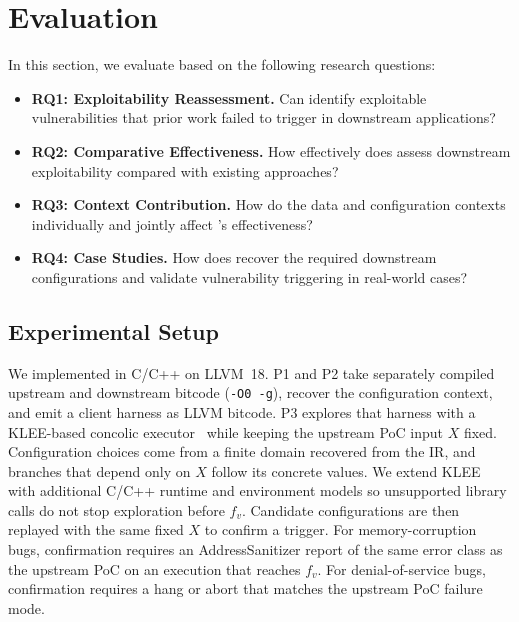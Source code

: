 \section{Evaluation}
\label{sec:eval}

In this section, we evaluate \sys based on the following research questions:

\begin{itemize}
    \setlength\itemsep{0.3em}
    \item \textbf{RQ1: Exploitability Reassessment.} Can \sys identify exploitable vulnerabilities that prior work failed to trigger in downstream applications?
    \item \textbf{RQ2: Comparative Effectiveness.} How effectively does \sys assess downstream exploitability compared with existing approaches?
    \item \textbf{RQ3: Context Contribution.} How do the data and configuration contexts individually and jointly affect \sys's effectiveness?
    \item \textbf{RQ4: Case Studies.} How does \sys recover the required downstream configurations and validate vulnerability triggering in real-world cases?
\end{itemize}

\subsection{Experimental Setup}
\label{subsec:eval-setup}

We implemented \sys in C/C++ on LLVM~18.
P1 and P2 take separately compiled upstream and downstream bitcode (\texttt{-O0 -g}), recover the configuration context, and emit a client harness as LLVM bitcode.
P3 explores that harness with a KLEE-based concolic executor~\cite{cadar2008klee} while keeping the upstream PoC input \(X\) fixed.
Configuration choices come from a finite domain recovered from the IR, and branches that depend only on \(X\) follow its concrete values.
We extend KLEE with additional C/C++ runtime and environment models so unsupported library calls do not stop exploration before \(f_v\).
Candidate configurations are then replayed with the same fixed \(X\) to confirm a trigger.
For memory-corruption bugs, confirmation requires an AddressSanitizer report of the same error class as the upstream PoC on an execution that reaches \(f_v\).
For denial-of-service bugs, confirmation requires a hang or abort that matches the upstream PoC failure mode.



